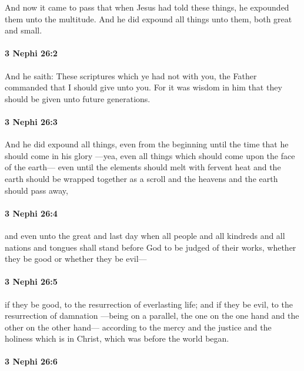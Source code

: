 			And now it came to pass that when Jesus had told these things,
			he expounded them unto the multitude.
			And he did expound all things unto them, both great and small.

		\paragraph{3 Nephi 26:2} %
			\label{3NEPHI-26-2}

			And he saith:
			These scriptures which ye had not with you,
			the Father commanded that I should give unto you.
			For it was wisdom in him that they should be given unto future generations.

		\paragraph{3 Nephi 26:3} %
			\label{3NEPHI-26-3}

			And he did expound all things, even from the beginning
			until the time that he should come in his glory
			---yea, even all things which should come upon the face of the earth---
			even until the elements should melt with fervent heat
			and the earth should be wrapped together as a scroll
			and the heavens and the earth should pass away,

		\paragraph{3 Nephi 26:4} %
			\label{3NEPHI-26-4}

			and even unto the great and last day
			when all people and all kindreds and all nations and tongues
			shall stand before God to be judged of their works,
			whether they be good or whether they be evil---

		\paragraph{3 Nephi 26:5} %
			\label{3NEPHI-26-5}

			if they be good, to the resurrection of everlasting life;
			and if they be evil, to the resurrection of damnation
			---being on a parallel, the one on the one hand and the other on the other hand---
			according to the mercy and the justice and the holiness which is in Christ,
			which was before the world began.

		\paragraph{3 Nephi 26:6} %
			\label{3NEPHI-26-6}

